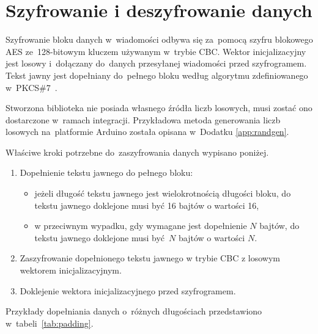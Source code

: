 \section{Szyfrowanie i deszyfrowanie danych}
\label{sec:encrypt}

Szyfrowanie bloku danych w~wiadomości odbywa się za~pomocą szyfru blokowego AES ze~128-bitowym kluczem używanym w~trybie CBC. Wektor inicjalizacyjny jest losowy i~dołączany do~danych przesyłanej wiadomości przed szyfrogramem. Tekst jawny jest dopełniany do~pełnego bloku według algorytmu zdefiniowanego w~PKCS\#7~\cite{kaliski1998pkcs}.

Stworzona biblioteka nie posiada własnego źródła liczb losowych, musi zostać ono dostarczone w~ramach integracji. Przykładowa metoda generowania liczb losowych na~platformie Arduino została opisana w~Dodatku \ref{app:randgen}.

Właściwe kroki potrzebne do~zaszyfrowania danych wypisano poniżej.

\begin{enumerate}
\item Dopełnienie tekstu jawnego do pełnego bloku:
\begin{itemize}
\item jeżeli długość tekstu jawnego jest wielokrotnością długości bloku, do tekstu jawnego doklejone musi być 16 bajtów o wartości 16,
\item w przeciwnym wypadku, gdy wymagane jest dopełnienie $ N $ bajtów, do tekstu jawnego doklejone musi być $ N $ bajtów o wartości $ N $.
\end{itemize}
\item Zaszyfrowanie dopełnionego tekstu jawnego w trybie CBC z losowym wektorem inicjalizacyjnym.
\item Doklejenie wektora inicjalizacyjnego przed szyfrogramem.
\end{enumerate}

Przykłady dopełniania danych o~różnych długościach przedstawiono w~tabeli~\ref{tab:padding}.

